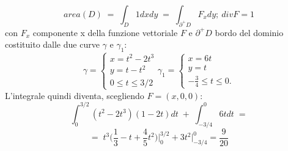 \documentclass[a4paper]{article}
\begin{document}
\begin{itemize}
\begin{enumerate}[label=(\alph*)]
\begin{equation}
area(D)\; = \; \int_{D}1dxdy \; = \; \int_{\partial^{+}D}F_{x}dy; \: divF=1
\end{equation}
con $F_{x}$ componente x della funzione vettoriale $F$ e $\partial^{+}D$ bordo del dominio costituito dalle due curve $\gamma$ e $\gamma_{1}$:
\begin{equation}
\gamma=
\begin{cases}
x=t^2 - 2t^3 \\
y= t - t^2 \\
0 \leq t \leq 3/2
\end{cases}
\gamma_{1}=
\begin{cases}
x=6t\\
y=t\\
-\frac{3}{4} \leq t \leq 0.
\end{cases}
\end{equation}
L'integrale quindi diventa, scegliendo $F=(x,0,0)$:
\begin{equation}
\int_{0}^{3/2}(t^2 - 2t^3)(1-2t)dt\; + \; \int_{-3/4}^{0}6tdt \;=
\end{equation}
\begin{equation*}
= \;t^3\bigg(\frac{1}{3} - t + \frac{4}{5}t^2 \bigg) \bigg|_{0}^{3/2} + 3t^2\bigg|_{-3/4}^{0} = \frac{9}{20}
\end{equation*}
\end{enumerate}
\end{itemize}
\end{document}

